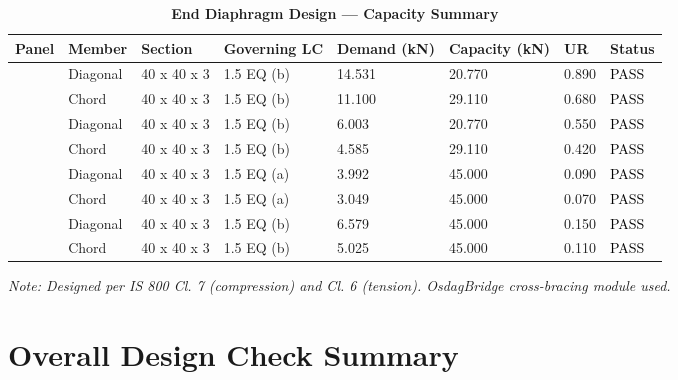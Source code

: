 \documentclass[12pt,a4paper]{report}
\numberwithin{table}{chapter}
\numberwithin{figure}{chapter}
\begin{document}
\begin{longtable}{|C{2.0cm}|L{1.8cm}|C{2.2cm}|C{3.0cm}|C{1.8cm}|C{1.8cm}|C{1.2cm}|C{1.8cm}|}
\caption{\textbf{End Diaphragm Design --- Capacity Summary}}
\hline
\textbf{Panel} & \textbf{Member} & \textbf{Section} & \textbf{Governing LC} & \textbf{Demand (kN)} & \textbf{Capacity (kN)} & \textbf{UR} & \textbf{Status} \\[6pt]
\hline
{} & Diagonal & 40 x 40 x 3 & 1.5 EQ (b) & 14.531 & 20.770 & 0.890 & \textcolor{black}{PASS} \\[6pt]
 & Chord & 40 x 40 x 3 & 1.5 EQ (b) & 11.100 & 29.110 & 0.680 & \textcolor{black}{PASS} \\[6pt]
\hline
{} & Diagonal & 40 x 40 x 3 & 1.5 EQ (b) & 6.003 & 20.770 & 0.550 & \textcolor{black}{PASS} \\[6pt]
 & Chord & 40 x 40 x 3 & 1.5 EQ (b) & 4.585 & 29.110 & 0.420 & \textcolor{black}{PASS} \\[6pt]
\hline
{} & Diagonal & 40 x 40 x 3 & 1.5 EQ (a) & 3.992 & 45.000 & 0.090 & \textcolor{black}{PASS} \\[6pt]
 & Chord & 40 x 40 x 3 & 1.5 EQ (a) & 3.049 & 45.000 & 0.070 & \textcolor{black}{PASS} \\[6pt]
\hline
{} & Diagonal & 40 x 40 x 3 & 1.5 EQ (b) & 6.579 & 45.000 & 0.150 & \textcolor{black}{PASS} \\[6pt]
 & Chord & 40 x 40 x 3 & 1.5 EQ (b) & 5.025 & 45.000 & 0.110 & \textcolor{black}{PASS} \\[6pt]
\hline
\end{longtable}
\noindent\textit{Note: Designed per IS 800 Cl. 7 (compression) and Cl. 6 (tension). OsdagBridge cross-bracing module used.}

\section{Overall Design Check Summary}
\label{sec:overall-summary}
\end{document}
